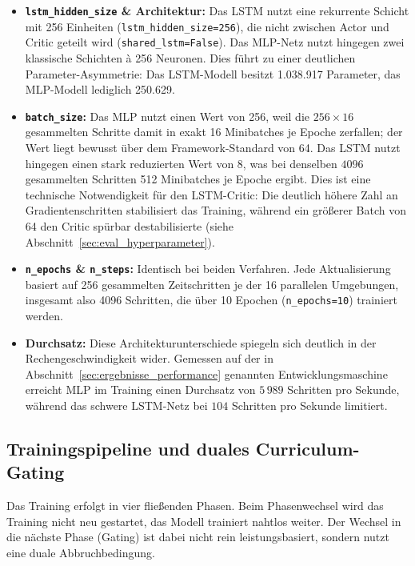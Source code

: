 \documentclass[
  a4paper,
  11pt,
  twoside,
  BCOR=8mm,           %
  headings=big,
  numbers=noenddot,
  listof=totoc,       %
  captions=tableheading,
]{scrreprt}
\begin{document}
\begin{itemize}
    \item \textbf{\texttt{lstm\_hidden\_size} \& Architektur:} Das LSTM nutzt eine rekurrente Schicht mit 256 Einheiten (\texttt{lstm\_hidden\_size=256}), die nicht zwischen Actor und Critic geteilt wird (\texttt{shared\_lstm=False}). Das MLP-Netz nutzt hingegen zwei klassische Schichten à 256 Neuronen. Dies führt zu einer deutlichen Parameter-Asymmetrie: Das LSTM-Modell besitzt 1.038.917 Parameter, das MLP-Modell lediglich 250.629.
    \item \textbf{\texttt{batch\_size}:} Das MLP nutzt einen Wert von 256, weil die $256 \times 16$ gesammelten Schritte damit in exakt 16 Minibatches je Epoche zerfallen; der Wert liegt bewusst über dem Framework-Standard von 64. Das LSTM nutzt hingegen einen stark reduzierten Wert von 8, was bei denselben $4096$ gesammelten Schritten 512 Minibatches je Epoche ergibt. Dies ist eine technische Notwendigkeit für den LSTM-Critic: Die deutlich höhere Zahl an Gradientenschritten stabilisiert das Training, während ein größerer Batch von 64 den Critic spürbar destabilisierte (siehe Abschnitt~\ref{sec:eval_hyperparameter}).
    \item \textbf{\texttt{n\_epochs} \& \texttt{n\_steps}:} Identisch bei beiden Verfahren. Jede Aktualisierung basiert auf 256 gesammelten Zeitschritten je der 16 parallelen Umgebungen, insgesamt also 4096 Schritten, die über 10 Epochen (\texttt{n\_epochs=10}) trainiert werden.
    \item \textbf{Durchsatz:} Diese Architekturunterschiede spiegeln sich deutlich in der Rechengeschwindigkeit wider. Gemessen auf der in Abschnitt~\ref{sec:ergebnisse_performance} genannten Entwicklungsmaschine erreicht MLP im Training einen Durchsatz von $5\,989$ Schritten pro Sekunde, während das schwere LSTM-Netz bei $104$ Schritten pro Sekunde limitiert.
\end{itemize}

\subsection{Trainingspipeline und duales Curriculum-Gating}
\label{sec:impl_rl_pipeline}
Das Training erfolgt in vier fließenden Phasen. Beim Phasenwechsel wird das Training nicht neu gestartet, das Modell trainiert nahtlos weiter. Der Wechsel in die nächste Phase (Gating) ist dabei nicht rein leistungsbasiert, sondern nutzt eine duale Abbruchbedingung.
\end{document}
